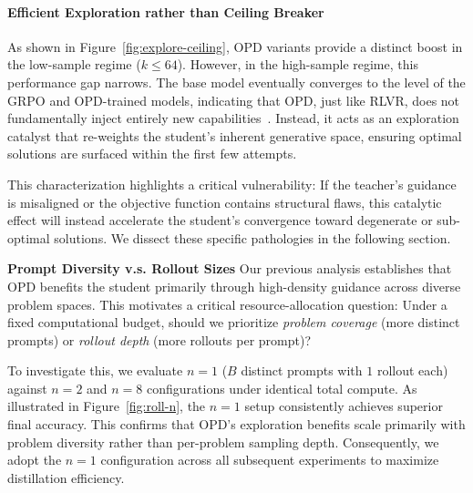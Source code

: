 \documentclass[11pt]{article}
\begin{document}
\paragraph{Efficient Exploration rather than Ceiling Breaker}
As shown in Figure~\ref{fig:explore-ceiling}, OPD variants provide a distinct boost in the low-sample regime ($k \leq 64$). 
However, in the high-sample regime, this performance gap narrows. 
The base model eventually converges to the level of the GRPO and OPD-trained models, indicating that OPD, just like RLVR, does not fundamentally inject entirely new capabilities~\cite{RL-no-up}. 
Instead, it acts as an exploration catalyst that re-weights the student's inherent generative space, ensuring optimal solutions are surfaced within the first few attempts.

This characterization highlights a critical vulnerability: 
If the teacher's guidance is misaligned or the objective function contains structural flaws, this catalytic effect will instead accelerate the student's convergence toward degenerate or sub-optimal solutions. 
We dissect these specific pathologies in the following section.

\vspace{-0.1mm}
\noindent \textbf{Prompt Diversity v.s. Rollout Sizes}\quad
Our previous analysis establishes that OPD benefits the student primarily through high-density guidance across diverse problem spaces. This motivates a critical resource-allocation question: {Under a fixed computational budget, should we prioritize \emph{problem coverage} (more distinct prompts) or \emph{rollout depth} (more rollouts per prompt)}? 

To investigate this, we evaluate $n{=}1$ ($B$ distinct prompts with $1$ rollout each) against $n{=}2$ and $n{=}8$ configurations under identical total compute. As illustrated in Figure~\ref{fig:roll-n}, the $n{=}1$ setup consistently achieves superior final accuracy. This confirms that OPD's exploration benefits scale primarily with problem diversity rather than per-problem sampling depth. Consequently, we adopt the $n=1$ configuration across all subsequent experiments to maximize distillation efficiency.
\end{document}
